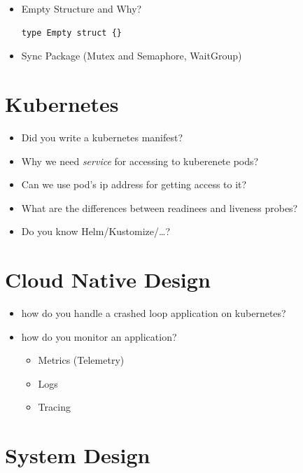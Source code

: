 \documentclass[]{article}
\begin{document}
\begin{multicols}{2}
\begin{itemize}
  \item Empty Structure and Why?
  \begin{verbatim}
type Empty struct {}
  \end{verbatim}

  \item Sync Package (Mutex and Semaphore, WaitGroup)
\end{itemize}

\section{Kubernetes}

\begin{itemize}
  \item Did you write a kubernetes manifest?
  \item Why we need \textit{service} for accessing to kuberenete pods?
  \item Can we use pod's ip address for getting access to it?
  \item What are the differences between readinees and liveness probes?
  \item Do you know Helm/Kustomize/\ldots?
\end{itemize}

\section{Cloud Native Design}

\begin{itemize}
  \item how do you handle a crashed loop application on kubernetes?
  \item how do you monitor an application?
  \begin{itemize}
    \item Metrics (Telemetry)
    \item Logs
    \item Tracing
  \end{itemize}
\end{itemize}

\section{System Design}


\end{multicols}
\end{document}
